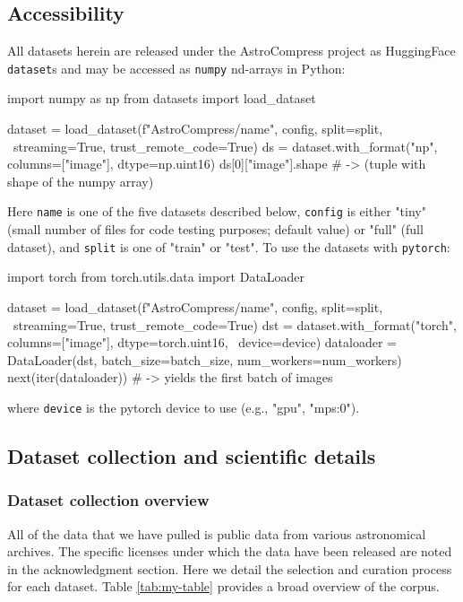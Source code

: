 \subsection{Accessibility}
All datasets herein are released under the AstroCompress project as HuggingFace \texttt{dataset}s and may be accessed as \texttt{numpy} nd-arrays in Python:
\begin{pyt}
import numpy as np
from datasets import load_dataset

dataset = load_dataset(f"AstroCompress/{name}", config, split=split, \ 
                       streaming=True, trust_remote_code=True)
ds = dataset.with_format("np", columns=["image"], dtype=np.uint16)
ds[0]["image"].shape # -> (tuple with shape of the numpy array)
\end{pyt}
Here \texttt{name} is one of the five datasets described below, \texttt{config} is either "tiny" (small number of files for code testing purposes; default value) or "full" (full dataset), and \texttt{split} is one of "train" or "test". 
To use the datasets with \texttt{pytorch}:
\begin{pyt}
import torch
from torch.utils.data import DataLoader

dataset = load_dataset(f"AstroCompress/{name}", config, split=split, \ 
                       streaming=True, trust_remote_code=True)
dst = dataset.with_format("torch", columns=["image"], dtype=torch.uint16, \
                          device=device)
dataloader = DataLoader(dst, batch_size=batch_size, num_workers=num_workers)
next(iter(dataloader)) # -> yields the first batch of images
\end{pyt}
where \texttt{device} is the pytorch device to use (e.g., "gpu", "mps:0").  


\subsection{Dataset collection and scientific details}

\subsubsection{Dataset collection overview}

All of the data that we have pulled is public data from various astronomical archives. The specific licenses under which the data have been released are noted in the acknowledgment section. Here we detail the selection and curation process for each dataset.  Table \ref{tab:my-table} provides a broad overview of the corpus.

